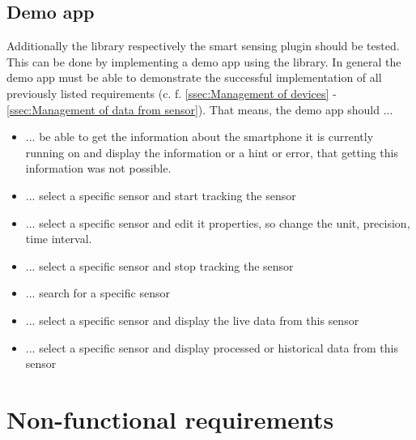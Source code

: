 \documentclass[12pt]{article}
\newcounter{fr}
\begin{document}
\subsection{Demo app}
Additionally the library respectively the smart sensing plugin should be tested. This can be done by implementing a demo app using the library. In general the demo app must be able to demonstrate the successful implementation of all previously listed requirements (c. f. \ref{ssec:Management of devices} - \ref{ssec:Management of data from sensor}). That means, the demo app should ... 
\begin{itemize}
    \item ... be able to get the information about the smartphone it is currently running on and display the information or a hint or error, that getting this information was not possible.
    \item ... select a specific sensor and start tracking the sensor
    \item ... select a specific sensor and edit it properties, so change the unit, precision, time interval.
    \item ... select a specific sensor and stop tracking the sensor
    \item ... search for a specific sensor
    \item ... select a specific sensor and display the live data from this sensor
    \item ... select a specific sensor and display processed or historical data from this sensor
\end{itemize}

\section{Non-functional requirements}
\end{document}
